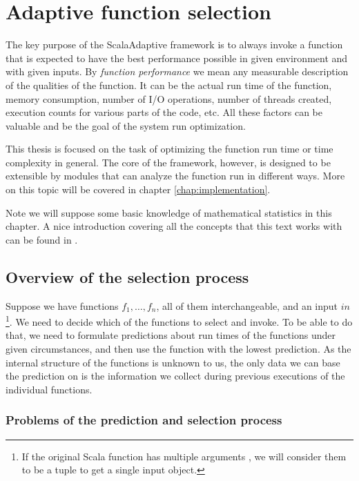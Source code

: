 \chapter{Adaptive function selection}
\label{chap:deciding}

The key purpose of the ScalaAdaptive framework is to always invoke a function that is expected to have the best performance possible in given environment and with given inputs. By \textit{function performance} we mean any measurable description of the qualities of the function. It can be the actual run time of the function, memory consumption, number of I/O operations, number of threads created, execution counts for various parts of the code, etc. All these factors can be valuable and be the goal of the system run optimization.

This thesis is focused on the task of optimizing the function run time or time complexity in general. The core of the framework, however, is designed to be extensible by modules that can analyze the function run in different ways. More on this topic will be covered in chapter \ref{chap:implementation}.

Note we will suppose some basic knowledge of mathematical statistics in this chapter. A nice introduction covering all the concepts that this text works with can be found in \cite{weiss_introductory_2010}.

\section{Overview of the selection process}
\label{sec:selection_overview}

Suppose we have functions $f_1,\dots, f_n$, all of them interchangeable, and an input $in$\footnote{If the original Scala function has multiple arguments , we will consider them to be a tuple  to get a single input object.}. We need to decide which of the functions to select and invoke. To be able to do that, we need to formulate predictions about run times of the functions under given circumstances, and then use the function with the lowest prediction. As the internal structure of the functions is unknown to us, the only data we can base the prediction on is the information we collect during previous executions of the individual functions.

\subsection{Problems of the prediction and selection process}

